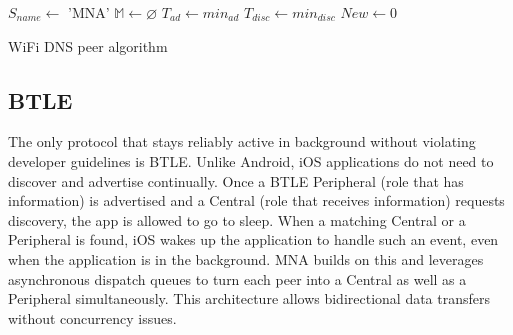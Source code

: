 \documentclass[conference]{IEEEtran}
\begin{document}
\begin{algorithm}[htb!]
\label{algo:dns}
\DontPrintSemicolon %
\SetAlgoLined
{}
 $S_{name} \gets$ \textsf{'MNA'}\;
 $\mathbb{M} \gets \varnothing$\;
 $T_{ad} \gets min_{ad}$\;
 $T_{disc} \gets min_{disc}$\;
 $New \gets 0$\;
 \caption{WiFi DNS peer algorithm}
\end{algorithm}
%
\subsection{BTLE}
\label{sec:btle}
%

The only protocol that stays reliably active in background without
violating developer guidelines is BTLE. Unlike Android, iOS
applications do not need to discover and advertise continually. Once a
BTLE Peripheral (role that has information) is advertised and a
Central (role that receives information) requests discovery, the app
is allowed to go to sleep. When a matching Central or a Peripheral is
found, iOS wakes up the application to handle such an event, even when
the application is in the background. MNA builds on this and leverages
asynchronous dispatch queues to turn each peer into a Central as well
as a Peripheral simultaneously. This architecture allows bidirectional
data transfers without concurrency issues.
\end{document}
